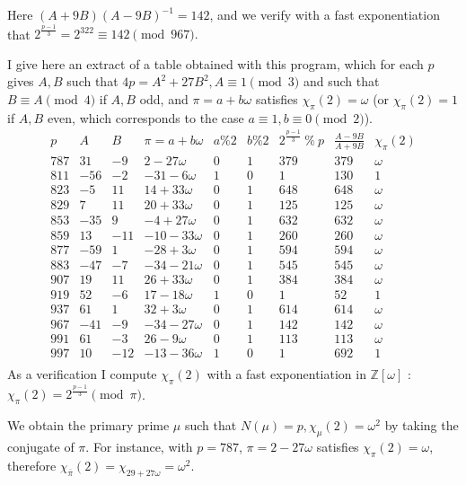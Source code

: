 \documentclass[11pt,a4paper]{article}
\newcommand{\Z}{\mathbb{Z}}
\begin{document}
  Here $(A + 9B) (A - 9B)^{-1} = 142$, and we verify with a fast exponentiation that $2^\frac{p-1}{3} = 2^{322} \equiv 142 \pmod {967}.$


I give here an extract of a table obtained with this program, which for each $p$ gives $A,B$ such that $4p = A^2 + 27 B^2, A \equiv 1 \pmod 3$ and such that $B \equiv A \pmod 4$ if $A,B$ odd, and $\pi =a +b \omega$ satisfies $\chi_\pi(2) = \omega$ (or $\chi_\pi(2) = 1$ if $A,B$ even, which corresponds to the case $a\equiv 1, b \equiv 0 \pmod 2$).
$$
\begin{array}{l|l|l|l|l|l|l|l|l}
p    &  A   & B  & \pi = a + b \omega   & a \text{\%} 2 & b \% 2 & 2^\frac{p-1}{3}\ \% \ p & \frac{A-9B}{A+9B} & \chi_\pi(2)\\
\hline
787 & 31 & -9 & 2  -27\omega & 0 & 1 & 379 & 379 &\omega \\
811 & -56 & -2 & -31  -6 \omega & 1 & 0 & 1 & 130 & 1 \\
823 & -5 & 11 & 14 + 33\omega & 0 & 1 & 648 & 648 & \omega \\
829 & 7 & 11 & 20 + 33\omega & 0 & 1 & 125 & 125 & \omega  \\
853 & -35 & 9 & -4 + 27\omega & 0 & 1 & 632 & 632 & \omega \\
859 & 13 & -11 & -10  -33\omega & 0 & 1 & 260 & 260 & \omega \\
877 & -59 & 1 & -28 + 3 \omega& 0 & 1 & 594 & 594 & \omega  \\
883 & -47 & -7 & -34  -21\omega & 0 & 1 & 545 & 545 & \omega \\
907 & 19 & 11 & 26 + 33\omega & 0 & 1 & 384 & 384 & \omega  \\
919 & 52 & -6 & 17  -18\omega & 1 & 0 & 1 & 52 & 1 \\
937 & 61 & 1 & 32 + 3\omega & 0 & 1 & 614 & 614 & \omega \\
967 & -41 & -9 & -34  -27\omega & 0 & 1 & 142 & 142 & \omega  \\
991 & 61 & -3 & 26  -9\omega & 0 & 1 & 113 & 113 & \omega  \\
997 & 10 & -12 & -13  -36\omega & 1 & 0 & 1 & 692 & 1 \\
\end{array}
$$
As a verification I compute $\chi_\pi(2)$ with a fast exponentiation in $\Z[\omega]$ : $\chi_\pi(2) = 2^\frac{p-1}{3} \pmod \pi$.

We obtain the primary prime $\mu$ such that $N(\mu) = p, \chi_\mu(2) = \omega^2$ by taking the conjugate of $\pi$. For instance, with $p = 787$,  $\pi =2 - 27\omega$ satisfies $\chi_\pi(2) = \omega$, therefore $\chi_{\overline{\pi}}(2) = \chi_{29 + 27\omega} = \omega^2$.
\end{document}
